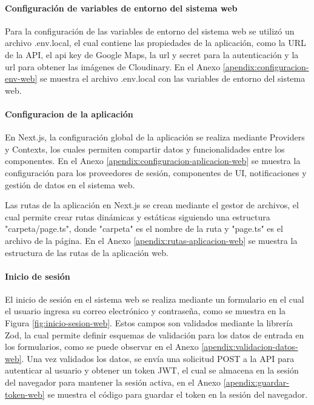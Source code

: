 \paragraph{Configuración de variables de entorno del sistema web}
Para la configuración de las variables de entorno del sistema web se utilizó un archivo .env.local, el cual contiene las propiedades
de la aplicación, como la URL de la API, el api key de Google Maps, la url y secret para la autenticación y la url
para obtener las imágenes de Cloudinary. En el Anexo \ref{apendix:configuracion-env-web} se muestra el archivo .env.local con las
variables de entorno del sistema web.

\paragraph{Configuracion de la aplicación}
En Next.js, la configuración global de la aplicación se realiza mediante Providers y Contexts, los cuales permiten compartir datos y
funcionalidades entre los componentes. En el Anexo \ref{apendix:configuracion-aplicacion-web} se muestra la configuración para los
proveedores de sesión, componentes de UI, notificaciones y gestión de datos en el sistema web.

Las rutas de la aplicación en Next.js se crean mediante el gestor de archivos, el cual permite crear rutas dinámicas y estáticas
siguiendo una estructura "carpeta/page.ts", donde "carpeta" es el nombre de la ruta y "page.ts" es el archivo de la página. En el
Anexo \ref{apendix:rutas-aplicacion-web} se muestra la estructura de las rutas de la aplicación web.

\paragraph{Inicio de sesión}
El inicio de sesión en el sistema web se realiza mediante un formulario en el cual el usuario ingresa su correo electrónico y
contraseña, como se muestra en la Figura \ref{fig:inicio-sesion-web}. Estos campos son validados mediante la librería Zod, la
cual permite definir esquemas de validación para los datos de entrada en los formularios, como se puede observar en el Anexo
\ref{apendix:validacion-datos-web}. Una vez validados los datos, se envía una solicitud POST a la API para autenticar al usuario
y obtener un token JWT, el cual se almacena en la sesión del navegador para mantener la sesión activa, en el Anexo
\ref{apendix:guardar-token-web} se muestra el código para guardar el token en la sesión del navegador.

